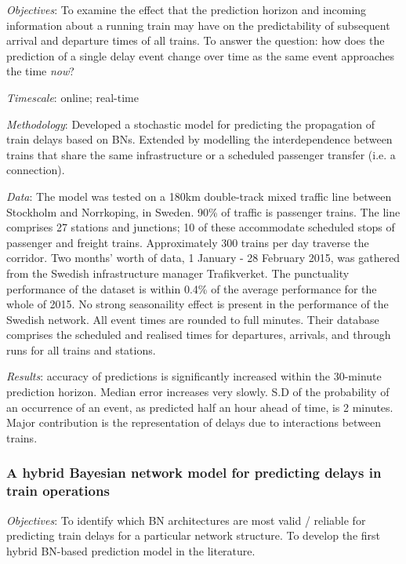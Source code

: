 \documentclass{article}
\begin{document}
\textit{Objectives}: To examine the effect that the prediction horizon and incoming information about a running train may have on the predictability of subsequent arrival and departure times of all trains. To answer the question: how does the prediction of a single delay event change over time as the same event approaches the time \textit{now}?

\smallskip

\textit{Timescale}: online; real-time

\smallskip

\textit{Methodology}: Developed a stochastic model for predicting the propagation of train delays based on BNs. Extended by modelling the interdependence between trains that share the same infrastructure or a scheduled passenger transfer (i.e. a connection).

\smallskip

\textit{Data}: The model was tested on a 180km double-track mixed traffic line between Stockholm and Norrkoping, in Sweden. 90\% of traffic is passenger trains. The line comprises 27 stations and junctions; 10 of these accommodate scheduled stops of passenger and freight trains. Approximately 300 trains per day traverse the corridor. Two months' worth of data, 1 January - 28 February 2015, was gathered from the Swedish infrastructure manager Trafikverket. The punctuality performance of the dataset is within 0.4\% of the average performance for the whole of 2015. No strong seasonaility effect is present in the performance of the Swedish network. All event times are rounded to full minutes. Their database comprises the scheduled and realised times for departures, arrivals, and through runs for all trains and stations. 

\smallskip

\textit{Results}: accuracy of predictions is significantly increased within the 30-minute prediction horizon. Median error increases very slowly. S.D of the probability of an occurrence of an event, as predicted half an hour ahead of time, is 2 minutes. Major contribution is the representation of delays due to interactions between trains. 

\subsubsection{A hybrid Bayesian network model for predicting delays in train operations \cite{lessan_fu_wen_2019}}

\textit{Objectives}: To identify which BN architectures are most valid / reliable for predicting train delays for a particular network structure. To develop the first hybrid BN-based prediction model in the literature.
\end{document}
